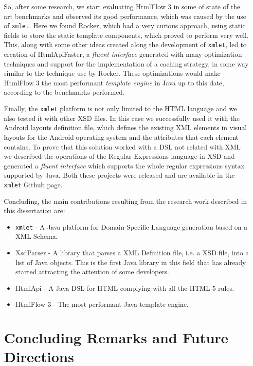 \noindent
So, after some research, we start evaluating HtmlFlow 3 in some of state of the art benchmarks and observed its good performance, which was caused by the use of \texttt{xmlet}. Here we found Rocker, which had a very curious approach, using static fields to store the static template components, which proved to perform very well. This, along with some other ideas created along the development of \texttt{xmlet}, led to creation of HtmlApiFaster, a \textit{fluent interface} generated with many optimization techniques and support for the implementation of a caching strategy, in some way similar to the technique use by Rocker. These optimizations would make HtmlFlow 3 the most performant \textit{template engine} in Java up to this date, according to the benchmarks performed.

\noindent
Finally, the \texttt{xmlet} platform is not only limited to the \ac{HTML} language and we also tested it with other \ac{XSD} files. In this case we successfully used it with the Android layouts definition file, which defines the existing \ac{XML} elements in visual layouts for the Android operating system and the attributes that each element contains. To prove that this solution worked with a \ac{DSL} not related with \ac{XML} we described the operations of the Regular Expressions language in \ac{XSD} and generated a \textit{fluent interface} which supports the whole regular expressions syntax supported by Java. Both these projects were released and are available in the \texttt{xmlet} Github page.

\noindent
Concluding, the main contributions resulting from the research work described in this dissertation are: 

\begin{itemize}
	\item \texttt{xmlet} - A Java platform for Domain Specific Language generation based on a XML Schema.
	\item XsdParser - A library that parses a \ac{XML} Definition file, i.e. a \ac{XSD} file, into a list of Java objects. This is the first Java library in this field that has already started attracting the attention of some developers.
	\item HtmlApi - A Java \ac{DSL} for \ac{HTML} complying with all the \ac{HTML} 5 rules.
	\item HtmlFlow 3 - The most performant Java template engine.
\end{itemize}

\section{Concluding Remarks and Future Directions}
\label{cha:concludingremarks}

